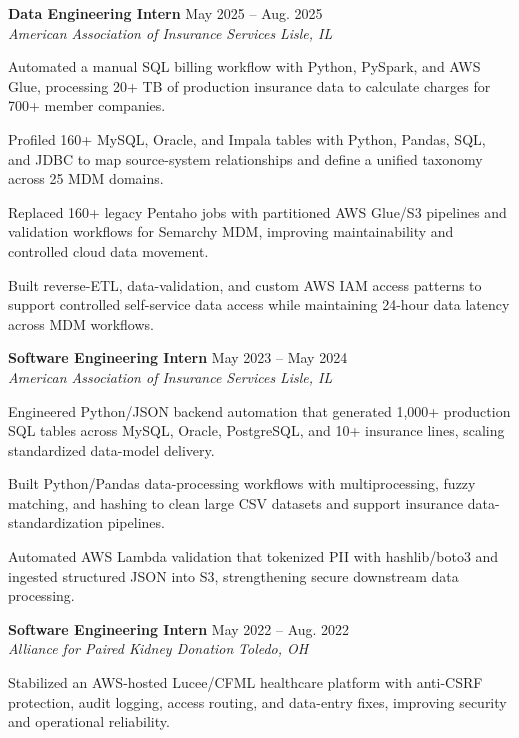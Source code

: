 \documentclass[letterpaper,11pt]{article}
\newcommand{\resumeSubheading}[4]{
  \textbf{#1} \hfill #2\\
  \textit{#3} \hfill \textit{#4}
}
\begin{document}
\resumeSubheading
{Data Engineering Intern}{May 2025 -- Aug. 2025}
{American Association of Insurance Services}{Lisle, IL}
\begin{tightitemize}
  \item Automated a manual SQL billing workflow with Python, PySpark, and AWS Glue, processing 20+ TB of production insurance data to calculate charges for 700+ member companies.
  \item Profiled 160+ MySQL, Oracle, and Impala tables with Python, Pandas, SQL, and JDBC to map source-system relationships and define a unified taxonomy across 25 MDM domains.
  \item Replaced 160+ legacy Pentaho jobs with partitioned AWS Glue/S3 pipelines and validation workflows for Semarchy MDM, improving maintainability and controlled cloud data movement.
  \item Built reverse-ETL, data-validation, and custom AWS IAM access patterns to support controlled self-service data access while maintaining 24-hour data latency across MDM workflows.
\end{tightitemize}

\resumeSubheading
{Software Engineering Intern}{May 2023 -- May 2024}
{American Association of Insurance Services}{Lisle, IL}
\begin{tightitemize}
  \item Engineered Python/JSON backend automation that generated 1,000+ production SQL tables across MySQL, Oracle, PostgreSQL, and 10+ insurance lines, scaling standardized data-model delivery.
  \item Built Python/Pandas data-processing workflows with multiprocessing, fuzzy matching, and hashing to clean large CSV datasets and support insurance data-standardization pipelines.
  \item Automated AWS Lambda validation that tokenized PII with hashlib/boto3 and ingested structured JSON into S3, strengthening secure downstream data processing.
\end{tightitemize}

\resumeSubheading
{Software Engineering Intern}{May 2022 -- Aug. 2022}
{Alliance for Paired Kidney Donation}{Toledo, OH}
\begin{tightitemize}
  \item Stabilized an AWS-hosted Lucee/CFML healthcare platform with anti-CSRF protection, audit logging, access routing, and data-entry fixes, improving security and operational reliability.
\end{tightitemize}
\end{document}
